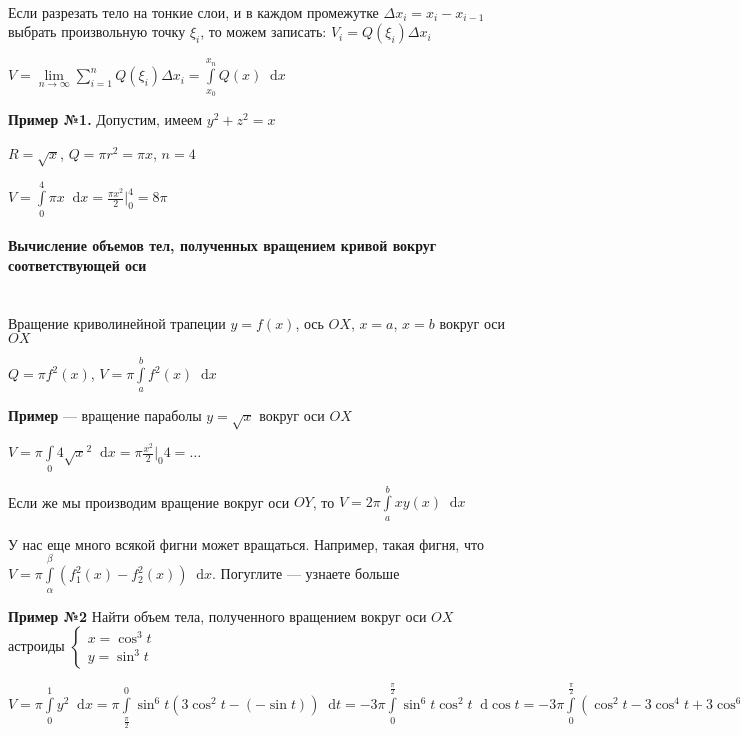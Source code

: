 \documentclass{article}
\newcommand*\diff{\mathop{}\!\mathrm{d}}
\begin{document}
\hfill \\[2mm]

Если разрезать тело на тонкие слои, и в каждом промежутке $\Delta x_i = x_i - x_{i - 1}$ выбрать произвольную точку $\xi_i$, то можем записать: $V_i = Q(\xi_i) \Delta x_i$

$V = \lim\limits_{n \to \infty} \sum\limits_{i = 1}^{n} Q(\xi_i) \Delta x_i = \int\limits_{x_0}^{x_{n}} Q(x) \diff x$

\hfill

\textbf{Пример №1.} Допустим, имеем $y^2 + z^2 = x$

$R = \sqrt{x}$, $Q = \pi r^2 = \pi x$, $n = 4$

$V = \int\limits_{0}^{4} \pi x \diff x = \frac{\pi x^2}{2} \bigg|_{0}^{4} = 8 \pi$

\paragraph{Вычисление объемов тел, полученных вращением кривой вокруг соответствующей оси}

\hfill \\[2mm]

Вращение криволинейной трапеции $y = f(x)$, ось $OX$, $x = a$, $x = b$ вокруг оси $OX$

$Q = \pi f^2(x)$, $V = \pi \int\limits_{a}^{b} f^2(x) \diff x$

\hfill

\textbf{Пример} — вращение параболы $y = \sqrt{x}$ вокруг оси $OX$

$V = \pi \int\limits_{0}{4} \sqrt{x}^2 \diff x = \pi \frac{x^2}{2} \bigg|_{0}{4} = \dots$ 

\hfill

Если же мы производим вращение вокруг оси $OY$, то $V = 2 \pi \int\limits_{a}^{b} x y(x) \diff x$

У нас еще много всякой фигни может вращаться. Например, такая фигня, что $V = \pi \int\limits_{\alpha}^{\beta} (f_1^2 (x) - f_2^2 (x)) \diff x$. Погуглите — узнаете больше

\hfill

\textbf{Пример №2} Найти объем тела, полученного вращением вокруг оси $OX$ астроиды $\begin{cases}
    x = \cos^3 t \\
    y = \sin^3 t
\end{cases}$

$V = \pi \int\limits_{0}^{1} y^2 \diff x = \pi \int\limits_{\frac{\pi}{2}}^{0} \sin^6 t (3 \cos^2 t - (-\sin t)) \diff t = -3 \pi \int\limits_{0}^{\frac{\pi}{2}} \sin^6 t \cos^2 t \diff \cos t = - 3 \pi \int\limits_{0}^{\frac{\pi}{2}} (\cos^2 t - 3 \cos^4 t + 3 \cos^6 t - \cos^8 t) \diff \cos t = -\frac{\cos^9 t}{9} - \frac{\cos^3 t}{3} - \frac{3\cos^5 t}{5} + \frac{3 \cos^7 t}{7} \bigg|_{0}^{\frac{\pi}{2}} = \dots$
\end{document}
